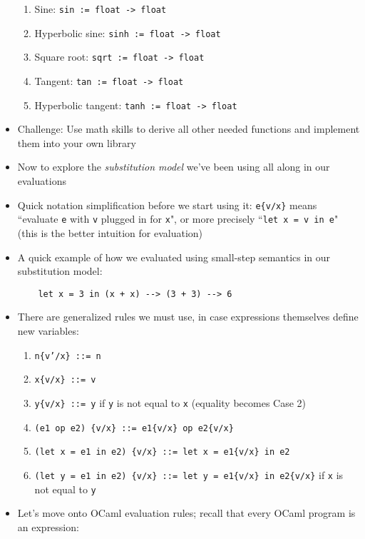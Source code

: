 \begin{itemize}
\begin{enumerate}
        \item Sine: \texttt{sin := float -> float}
        \item Hyperbolic sine: \texttt{sinh := float -> float}
        \item Square root: \texttt{sqrt := float -> float}
        \item Tangent: \texttt{tan := float -> float}
        \item Hyperbolic tangent: \texttt{tanh := float -> float}
    \end{enumerate}
    \item Challenge: Use math skills to derive all other needed functions and implement them into your own library
    \item Now to explore the \textit{substitution model} we've been using all along in our evaluations
    \item Quick notation simplification before we start using it: \texttt{e\{v/x\}} means ``evaluate \texttt{e} with \texttt{v} plugged in for \texttt{x}", or more precisely ``\lstinline{let x = v in e}" (this is the better intuition for evaluation)
    \item A quick example of how we evaluated using small-step semantics in our substitution model:
    \begin{lstlisting}
    let x = 3 in (x + x) --> (3 + 3) --> 6
    \end{lstlisting}
    \item There are generalized rules we must use, in case expressions themselves define new variables:
    \begin{enumerate}
        \item \texttt{n\{v'/x\} ::= n}
        \item \texttt{x\{v/x\} ::= v}
        \item \texttt{y\{v/x\} ::= y} if \texttt{y} is not equal to \texttt{x} (equality becomes Case 2)
        \item \texttt{(e1 op e2) \{v/x\} ::= e1\{v/x\} op e2\{v/x\}}
        \item \texttt{(let x = e1 in e2) \{v/x\} ::= let x = e1\{v/x\} in e2}
        \item \texttt{(let y = e1 in e2) \{v/x\} ::= let y = e1\{v/x\} in e2\{v/x\}} if \texttt{x} is not equal to \texttt{y}
    \end{enumerate}
    \item Let's move onto \textsf{OCaml} evaluation rules; recall that every \textsf{OCaml} program is an expression:
    \begin{enumerate}

\end{enumerate}
\end{itemize}
